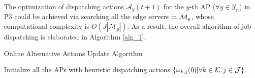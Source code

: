 The optimization of {dispatching actions $\mathcal{A}_{y}(t+1)$} for the $y$-th AP ($\forall y\in\mathcal{Y}_{n}$) in P3 could be achieved via searching all the edge servers in $\mathcal{M}_{y}$, {whose computational complexity is $O(J|\mathcal{M}_{y}|)$}.
As a result, the overall algorithm of job dispatching is elaborated in Algorithm \ref{alg_1}.
\begin{algorithm}[ht]
    \caption{Online Alternative Actions Update Algorithm}\label{alg_1}
    \DontPrintSemicolon %
    Initialize all the APs with heuristic dispatching actions $\{{\omega}_{k,j}(0)|\forall k\in\mathcal{K},j\in\mathcal{J}\}$.\;
\end{algorithm}

